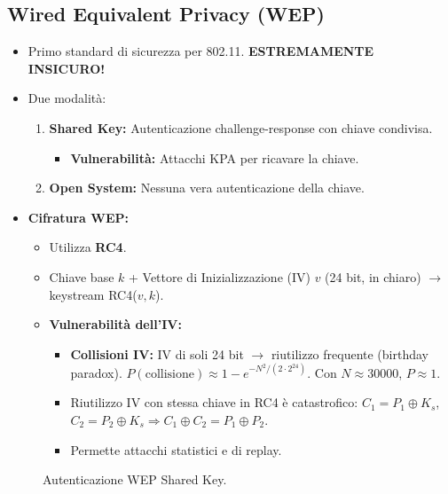 \subsection{Wired Equivalent Privacy (WEP)}
\begin{itemize}
    \item Primo standard di sicurezza per 802.11. \textbf{ESTREMAMENTE INSICURO!}
    \item Due modalità:
    \begin{enumerate}
        \item \textbf{Shared Key:} Autenticazione challenge-response con chiave condivisa.
        \begin{itemize}
            \item \textbf{Vulnerabilità:} Attacchi KPA per ricavare la chiave.
        \end{itemize}
        \item \textbf{Open System:} Nessuna vera autenticazione della chiave.
    \end{enumerate}
    \item \textbf{Cifratura WEP:}
    \begin{itemize}
        \item Utilizza \textbf{RC4}.
        \item Chiave base $k$ + Vettore di Inizializzazione (IV) $v$ (24 bit, in chiaro) $\rightarrow$ keystream RC4($v,k$).
        \item \textbf{Vulnerabilità dell'IV:}
        \begin{itemize}
            \item \textbf{Collisioni IV:} IV di soli 24 bit $\rightarrow$ riutilizzo frequente (birthday paradox).
            $P(\text{collisione}) \approx 1 - e^{-N^2 / (2 \cdot 2^{24})}$. Con $N \approx 30000$, $P \approx 1$.
            \item Riutilizzo IV con stessa chiave in RC4 è catastrofico: $C_1 = P_1 \oplus K_s$, $C_2 = P_2 \oplus K_s \Rightarrow C_1 \oplus C_2 = P_1 \oplus P_2$.
            \item Permette attacchi statistici e di replay.
        \end{itemize}
    \end{itemize}
\end{itemize}

\begin{figure}[H]
\centering
{}
\caption{Autenticazione WEP Shared Key.}
\label{fig:wep_shared_key}
\end{figure}

